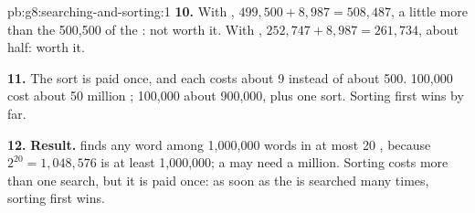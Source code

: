 \begin{solution}{pb:g8:searching-and-sorting:1}
\textbf{10.} With , $499{,}500 + 8{,}987 = 508{,}487$, a little
more than the 500,500 of the : not worth it. With , $252{,}747 + 8{,}987 = 261{,}734$, about half: worth it.

\textbf{11.} The sort is paid once, and each  costs about 9
 instead of about 500. 100,000  cost about
50 million ; 100,000  about 900,000, plus one sort.
Sorting first wins by far.

\textbf{12.} \textbf{Result.}  finds any word among 1,000,000
 words in at most 20 , because $2^{20} = 1{,}048{,}576$ is at
least 1,000,000; a  may need a million. Sorting costs more than
one search, but it is paid once: as soon as the  is searched many times,
sorting first wins.
\end{solution}
